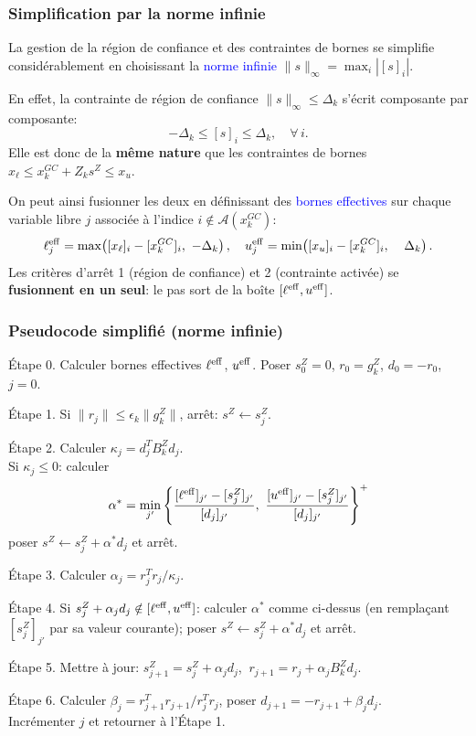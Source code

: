 \documentclass[t,aspectratio=169,usepdftitle=false]{beamer}
\def\blue{\color{blue}}
\begin{document}
\begin{frame}
\frametitle{Simplification par la norme infinie}

La gestion de la région de confiance et des contraintes de bornes se simplifie considérablement en choisissant la \textcolor{blue}{norme infinie} $\| s \|_\infty = \max_i |[s]_i|$.

\mbox{}

En effet, la contrainte de région de confiance $\| s \|_\infty \leq \Delta_k$ s'écrit composante par composante:
$$
-\Delta_k \leq [s]_i \leq \Delta_k, \quad \forall\, i.
$$
Elle est donc de la \textbf{même nature} que les contraintes de bornes $x_\ell \leq x_k^{GC} + Z_k s^Z \leq x_u$.

\mbox{}

On peut ainsi fusionner les deux en définissant des \textcolor{blue}{bornes effectives} sur chaque variable libre $j$ associée à l'indice $i \notin \mathcal{A}(x_k^{GC})$:
$$
\ell_j^{\rm eff} = \max\!\left([x_\ell]_i - [x_k^{GC}]_i,\ -\Delta_k\right), \quad
u_j^{\rm eff} = \min\!\left([x_u]_i - [x_k^{GC}]_i,\ \phantom{-}\Delta_k\right).
$$
Les critères d'arrêt 1 (région de confiance) et 2 (contrainte activée) se \textbf{fusionnent en un seul}: le pas sort de la boîte $[\ell^{\rm eff}, u^{\rm eff}]$.

\end{frame}

\begin{frame}
\frametitle{Pseudocode simplifié (norme infinie)}

{\blue Étape 0.} Calculer bornes effectives $\ell^{\rm eff}$, $u^{\rm eff}$.
Poser $s_0^Z = 0$, $r_0 = g_k^Z$, $d_0 = -r_0$, $j = 0$.

{\blue Étape 1.} Si $\| r_j \| \leq \epsilon_k \| g_k^Z \|$, arrêt: $s^Z \leftarrow s_j^Z$.

{\blue Étape 2.} Calculer $\kappa_j = d_j^T B_k^Z d_j$.\\
Si $\kappa_j \leq 0$: calculer
$$
\alpha^* = \min_{j'}\left\{ \frac{[\ell^{\rm eff}]_{j'} - [s_j^Z]_{j'}}{[d_j]_{j'}},\ \frac{[u^{\rm eff}]_{j'} - [s_j^Z]_{j'}}{[d_j]_{j'}} \right\}^+
$$
poser $s^Z \leftarrow s_j^Z + \alpha^* d_j$ et arrêt.

{\blue Étape 3.} Calculer $\alpha_j = r_j^T r_j / \kappa_j$.

{\blue Étape 4.} Si $s_j^Z + \alpha_j d_j \notin [\ell^{\rm eff}, u^{\rm eff}]$: calculer $\alpha^*$ comme ci-dessus (en remplaçant $[s_j^Z]_{j'}$ par sa valeur courante); poser $s^Z \leftarrow s_j^Z + \alpha^* d_j$ et arrêt.

{\blue Étape 5.} Mettre à jour: $s_{j+1}^Z = s_j^Z + \alpha_j d_j$, $\ r_{j+1} = r_j + \alpha_j B_k^Z d_j$.

{\blue Étape 6.} Calculer $\beta_j = r_{j+1}^T r_{j+1} / r_j^T r_j$, poser $d_{j+1} = -r_{j+1} + \beta_j d_j$.\\
Incrémenter $j$ et retourner à l'Étape 1.

\end{frame}
\end{document}
